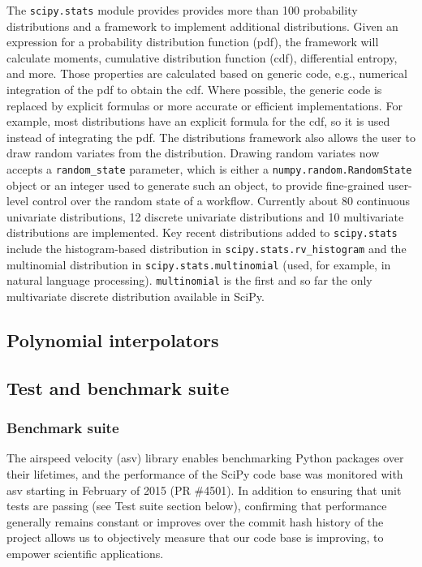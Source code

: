 \documentclass[fleqn,10pt]{wlscirep}
\begin{document}
The \texttt{scipy.stats} module provides provides more than 100 probability
distributions and a framework to implement additional distributions. Given an
expression for a probability distribution function (pdf), the framework will
calculate moments, cumulative distribution function (cdf), differential
entropy, and more. Those properties are calculated based on generic code, e.g.,
numerical integration of the pdf to obtain the cdf.  Where possible, the
generic code is replaced by explicit formulas or more accurate or efficient
implementations. For example, most distributions have an explicit formula for
the cdf, so it is used instead of integrating the pdf. The distributions
framework also allows the user to draw random variates from the distribution.
Drawing random variates now accepts a \texttt{random\_state} parameter, which
is either a \texttt{numpy.random.RandomState} object or an integer used to
generate such an object, to provide fine-grained user-level control over the
random state of a workflow.  Currently about 80 continuous univariate
distributions, 12 discrete univariate distributions and 10 multivariate
distributions are implemented.  Key recent distributions added to
\texttt{scipy.stats} include the histogram-based distribution in
\texttt{scipy.stats.rv\_histogram} and the multinomial distribution in
\texttt{scipy.stats.multinomial} (used, for example, in natural language
processing\cite{Griffiths5228}). \texttt{multinomial} is the first and so far
the only multivariate discrete distribution available in SciPy.


\subsection*{Polynomial interpolators}



\subsection*{Test and benchmark suite}

\subsubsection*{Benchmark suite}

The airspeed velocity (asv\cite{asvref}) library enables benchmarking Python packages
over their lifetimes, and the performance of the SciPy code base was monitored
with asv starting in February of 2015 (PR \#4501). In addition to ensuring that
unit tests are passing (see Test suite section below), confirming 
that performance generally
remains constant or improves over the commit hash history of the project allows
us to objectively measure that our code base is improving, to empower
scientific applications.
\end{document}
